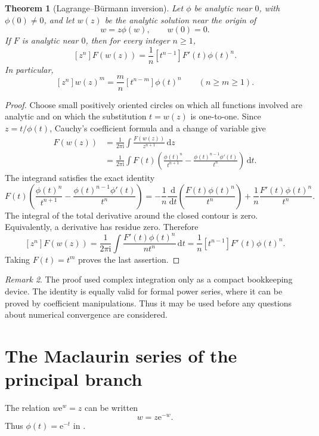 \documentclass[11pt,openany]{book}
\newcommand{\e}{\mathrm{e}}
\newcommand{\ii}{\mathrm{i}}
\newcommand{\dd}{\,\mathrm{d}}
\theoremstyle{plain}
\newtheorem{theorem}{Theorem}[chapter]
\theoremstyle{definition}
\theoremstyle{remark}
\newtheorem{remark}[theorem]{Remark}
\begin{document}
\begin{theorem}[Lagrange--B\"urmann inversion]\label{thm:lagrange}
Let \(\phi\) be analytic near \(0\), with \(\phi(0)\ne0\), and let \(w(z)\)
be the analytic solution near the origin of
\[
             w=z\phi(w),\qquad w(0)=0.
\]
If \(F\) is analytic near \(0\), then for every integer \(n\ge1\),
\begin{equation}\label{eq:lagrange}
 [z^n]F(w(z))=\frac1n[t^{n-1}]F'(t)\phi(t)^n.
\end{equation}
In particular,
\[
 [z^n]w(z)^m=\frac mn[t^{n-m}]\phi(t)^n
 \qquad(n\ge m\ge1).
\]
\end{theorem}

\begin{proof}
Choose small positively oriented circles on which all functions involved are
analytic and on which the substitution \(t=w(z)\) is one-to-one.  Since
\(z=t/\phi(t)\), Cauchy's coefficient formula and a change of variable give
\begin{align*}
 [z^n]F(w(z))
 &=\frac{1}{2\pi\ii}\int
       \frac{F(w(z))}{z^{n+1}}\dd z\\
 &=\frac{1}{2\pi\ii}\int
   F(t)\left(
      \frac{\phi(t)^n}{t^{n+1}}
      -\frac{\phi(t)^{n-1}\phi'(t)}{t^n}
   \right)\dd t.
\end{align*}
The integrand satisfies the exact identity
\[
 F(t)\left(
      \frac{\phi(t)^n}{t^{n+1}}
      -\frac{\phi(t)^{n-1}\phi'(t)}{t^n}
   \right)
 =-\frac1n\frac{\dd}{\dd t}
   \left(\frac{F(t)\phi(t)^n}{t^n}\right)
  +\frac1n\frac{F'(t)\phi(t)^n}{t^n}.
\]
The integral of the total derivative around the closed contour is zero.
Equivalently, a derivative has residue zero.  Therefore
\[
 [z^n]F(w(z))
 =\frac{1}{2\pi\ii}\int
   \frac{F'(t)\phi(t)^n}{n t^n}\dd t
 =\frac1n[t^{n-1}]F'(t)\phi(t)^n.
\]
Taking \(F(t)=t^m\) proves the last assertion.
\end{proof}

\begin{remark}
The proof used complex integration only as a compact bookkeeping device.  The
identity is equally valid for formal power series, where it can be proved by
coefficient manipulations.  Thus it may be used before any questions about
numerical convergence are considered.
\end{remark}

\section{The Maclaurin series of the principal branch}
The relation \(w\e^w=z\) can be written
\[
             w=z\e^{-w}.
\]
Thus \(\phi(t)=\e^{-t}\) in .
\end{document}
